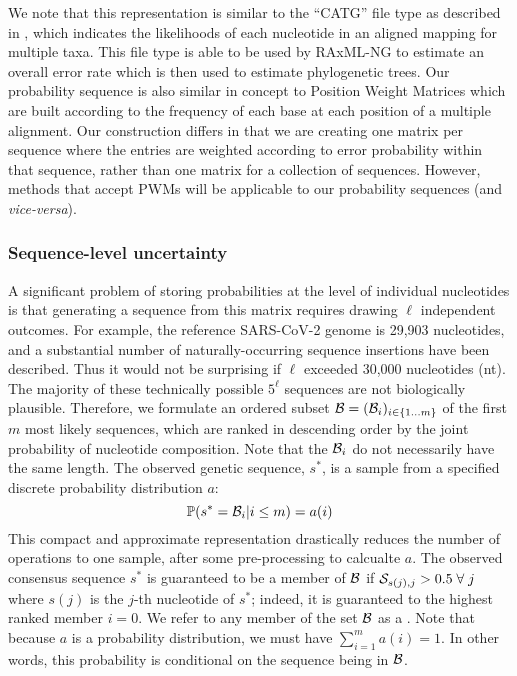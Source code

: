 \documentclass[10pt]{article}
\begin{document}
We note that this representation is similar to the ``CATG'' file type as described in \citet{kozlovModelsOptimizationsTools2018}, which indicates the likelihoods of each nucleotide in an aligned mapping for multiple taxa. 
This file type is able to be used by RAxML-NG to estimate an overall error rate which is then used to estimate phylogenetic trees.
Our probability sequence is also similar in concept to Position Weight Matrices \citep[PWMs, ][]{stormoUsePerceptronAlgorithm1982} which are built according to the frequency of each base at each position of a multiple alignment. 
Our construction differs in that we are creating one matrix per sequence where the entries are weighted according to error probability within that sequence, rather than one matrix for a collection of sequences. 
However, methods that accept PWMs will be applicable to our probability sequences (and \emph{vice-versa}).


\subsubsection{Sequence-level uncertainty}

A significant problem of storing probabilities at the level of individual nucleotides is that generating a sequence from this matrix requires drawing $\ell$ independent outcomes.
For example, the reference SARS-CoV-2 genome is 29,903 nucleotides, and a substantial number of naturally-occurring sequence insertions have been described.
Thus it would not be surprising if $\ell$ exceeded 30,000 nucleotides (nt).
The majority of these technically possible $5^\ell$ sequences are not biologically plausible.
Therefore, we formulate an ordered subset $\mathcal{B} = (\mathcal{B}_i)_{i\in\{1\ldots m\} }$ of the first $m$ most likely sequences, which are ranked in descending order by the joint probability of nucleotide composition.
Note that the $\mathcal{B}_i$ do not necessarily have the same length.
The observed genetic sequence, $s^*$, is a sample from a specified discrete probability distribution $a$:
\begin{equation}
\mathbb{P}(s^* = \mathcal{B}_i | i \le m) = a(i)
\end{equation}
This compact and approximate representation drastically reduces the number of operations to one sample, after some pre-processing to calcualte $a$.
The observed consensus sequence $s^*$ is guaranteed to be a member of $\mathcal{B}$ if $\mathcal{S}_{s(j), j} > 0.5\;\forall\;j$ where $s(j)$ is the $j$-th nucleotide of $s^*$; indeed, it is guaranteed to the highest ranked member $i=0$.
We refer to any member of the set $\mathcal{B}$ as a \emph{\slps}.
Note that because $a$ is a probability distribution, we must have $\sum_{i=1}^m a(i) = 1$.
In other words, this probability is conditional on the sequence being in $\mathcal{B}$.
\end{document}
